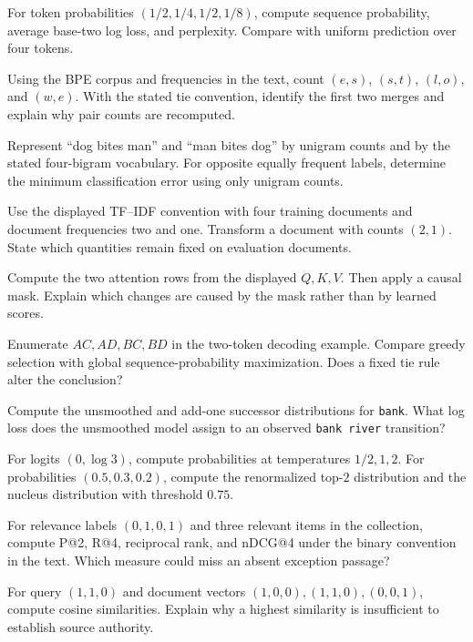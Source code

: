 \begin{exercises}
\item {}For token probabilities $(1/2,1/4,1/2,1/8)$, compute sequence probability, average base-two log loss, and perplexity. Compare with uniform prediction over four tokens.
\item {}Using the BPE corpus and frequencies in the text, count $(e,s)$, $(s,t)$, $(l,o)$, and $(w,e)$. With the stated tie convention, identify the first two merges and explain why pair counts are recomputed.
\item {}Represent ``dog bites man'' and ``man bites dog'' by unigram counts and by the stated four-bigram vocabulary. For opposite equally frequent labels, determine the minimum classification error using only unigram counts.
\item {}Use the displayed TF--IDF convention with four training documents and document frequencies two and one. Transform a document with counts $(2,1)$. State which quantities remain fixed on evaluation documents.
\item {}Compute the two attention rows from the displayed $Q,K,V$. Then apply a causal mask. Explain which changes are caused by the mask rather than by learned scores.
\item {}Enumerate $AC,AD,BC,BD$ in the two-token decoding example. Compare greedy selection with global sequence-probability maximization. Does a fixed tie rule alter the conclusion?
\item {}Compute the unsmoothed and add-one successor distributions for \texttt{bank}. What log loss does the unsmoothed model assign to an observed \texttt{bank river} transition?
\item {}For logits $(0,\log3)$, compute probabilities at temperatures $1/2,1,2$. For probabilities $(0.5,0.3,0.2)$, compute the renormalized top-$2$ distribution and the nucleus distribution with threshold $0.75$.
\item {}For relevance labels $(0,1,0,1)$ and three relevant items in the collection, compute P@2, R@4, reciprocal rank, and nDCG@4 under the binary convention in the text. Which measure could miss an absent exception passage?
\item {}For query $(1,1,0)$ and document vectors $(1,0,0),(1,1,0),(0,0,1)$, compute cosine similarities. Explain why a highest similarity is insufficient to establish source authority.

\end{exercises}
